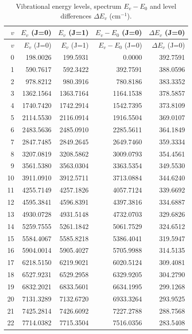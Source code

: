 \documentclass[11pt]{article}
\begin{document}
\begin{longtable}{r r r r r}
\caption{Vibrational energy levels, spectrum $E_v-E_0$ and level differences $\Delta E_v$ (cm$^{-1}$).}\\
\toprule $v$ & $E_v$ (J=0) & $E_v$ (J=1) & $E_v-E_0$ (J=0) & $\Delta E_v$ (J=0) \\\midrule\endfirsthead
\toprule $v$ & $E_v$ (J=0) & $E_v$ (J=1) & $E_v-E_0$ (J=0) & $\Delta E_v$ (J=0) \\\midrule\endhead
0 & 198.0026 & 199.5931 & 0.0000 & 392.7591 \\
1 & 590.7617 & 592.3422 & 392.7591 & 388.0596 \\
2 & 978.8212 & 980.3916 & 780.8186 & 383.3352 \\
3 & 1362.1564 & 1363.7164 & 1164.1538 & 378.5857 \\
4 & 1740.7420 & 1742.2914 & 1542.7395 & 373.8109 \\
5 & 2114.5530 & 2116.0914 & 1916.5504 & 369.0107 \\
6 & 2483.5636 & 2485.0910 & 2285.5611 & 364.1849 \\
7 & 2847.7485 & 2849.2645 & 2649.7460 & 359.3334 \\
8 & 3207.0819 & 3208.5862 & 3009.0793 & 354.4561 \\
9 & 3561.5380 & 3563.0304 & 3363.5354 & 349.5530 \\
10 & 3911.0910 & 3912.5711 & 3713.0884 & 344.6240 \\
11 & 4255.7149 & 4257.1826 & 4057.7124 & 339.6692 \\
12 & 4595.3841 & 4596.8391 & 4397.3816 & 334.6887 \\
13 & 4930.0728 & 4931.5148 & 4732.0703 & 329.6826 \\
14 & 5259.7555 & 5261.1842 & 5061.7529 & 324.6512 \\
15 & 5584.4067 & 5585.8218 & 5386.4041 & 319.5947 \\
16 & 5904.0014 & 5905.4027 & 5705.9988 & 314.5135 \\
17 & 6218.5150 & 6219.9021 & 6020.5124 & 309.4081 \\
18 & 6527.9231 & 6529.2958 & 6329.9205 & 304.2790 \\
19 & 6832.2021 & 6833.5601 & 6634.1995 & 299.1268 \\
20 & 7131.3289 & 7132.6720 & 6933.3264 & 293.9525 \\
21 & 7425.2814 & 7426.6092 & 7227.2788 & 288.7568 \\
22 & 7714.0382 & 7715.3504 & 7516.0356 & 283.5408 \\

\end{longtable}
\end{document}
